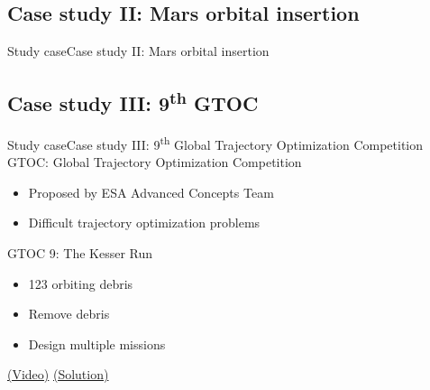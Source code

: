 \documentclass[10pt,compress]{beamer} %
\begin{document}
\subsection{Case study II: Mars orbital insertion}
\begin{frame}{Study case}{Case study II: Mars orbital insertion}
    \setlength{\fboxrule}{0pt}
\end{frame}

\subsection{Case study III: 9\textsuperscript{th} GTOC}
\begin{frame}{Study case}{Case study III: 9\textsuperscript{th} Global Trajectory Optimization Competition}
    GTOC: Global Trajectory Optimization Competition
    \begin{itemize}
        \item Proposed by ESA Advanced Concepts Team
        \item Difficult trajectory optimization problems
    \end{itemize}

    GTOC 9: The Kesser Run
    \begin{itemize}
        \item 123 orbiting debris
        \item Remove debris
        \item Design multiple missions
    \end{itemize}
    \href{https://www.youtube.com/watch?v=zvxZx-QnqQ0}{(Video)}
    \href{https://www.youtube.com/watch?v=5CQNG6OIbZM}{(Solution)}
\end{frame}
\end{document}
